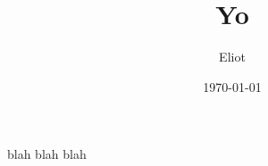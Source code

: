 \documentclass[letterpaper]{article}
\title{Yo}
\author{Eliot}
\date{\today}
\begin{document}
\maketitle{}
blah blah blah
\end{document}
